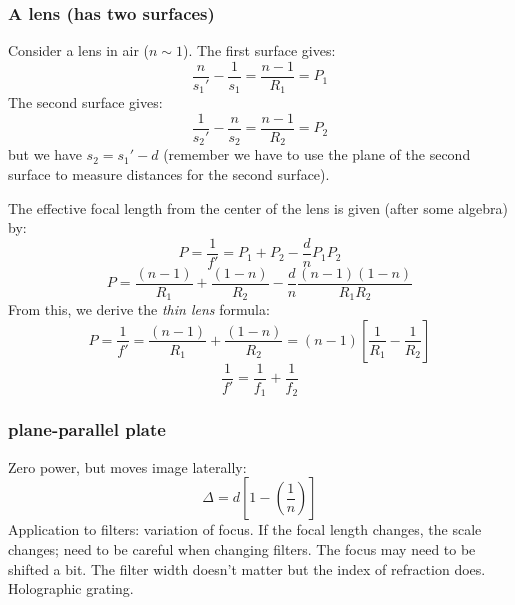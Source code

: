 \documentclass[12pt]{article}
\newcommand{\mynotes}[1]{\textcolor{myBlue}{#1}}
\begin{document}
\subsubsection{A lens (has two surfaces)}
Consider a lens in air ($n \sim 1$). The first surface gives:
\[
    \frac{n}{s_{1}'}-\frac{1}{s_{1}} = \frac{n-1}{R_{1}}=P_{1}
    \]
The second surface gives:
\[
    \frac{1}{s_{2}'}-\frac{n}{s_{2}} = \frac{n-1}{R_{2}}=P_{2}
    \]
but we have $s_{2} = s_{1}'-d$ (remember we have to use the plane of the
second surface to measure distances for the second surface).

The effective focal length from the center of the lens
is given (after some algebra) by:
\[
    P=\frac{1}{f'}=P_{1}+P_{2}-\frac{d}{n}P_{1}P_{2}
    \]
\[
    P=\frac{(n-1)}{R_{1}}+\frac{(1-n)}{R_{2}}-\frac{d}{n}
    \frac{(n-1)(1-n)}{R_{1}R_{2}}
    \]
From this, we derive the \textit{thin lens} formula:
\[
    P
    = \frac{1}{f'}
    = \frac{(n-1)}{R_{1}}+\frac{(1-n)}{R_{2}}
    = (n-1) \left[ \frac{1}{R_{1}} - \frac{1}{R_{2}} \right]
    \]
\[
    \frac{1}{f'} = \frac{1}{f_{1}} + \frac{1}{f_{2}}
    \]

\subsubsection{plane-parallel plate}
Zero power, but moves image laterally:
\[
    \Delta = d \left[ 1 - \left( \frac{1}{n} \right) \right]
    \]
Application to filters: variation of focus.
\mynotes{If the focal length
changes, the scale changes; need to be careful when changing filters.
The focus may need to be shifted a bit. The filter width doesn't matter
but the index of refraction does. Holographic grating.}
\end{document}
